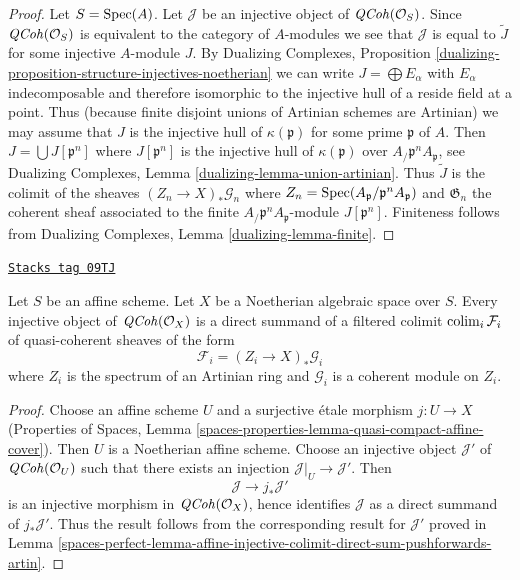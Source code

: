 \begin{proof}
Let $S = \operatorname{Spec}(A)$. Let $\mathcal{J}$ be an injective object of
$\mathit{QCoh}(\mathcal{O}_S)$. Since $\mathit{QCoh}(\mathcal{O}_S)$ is
equivalent to the category of $A$-modules we see that $\mathcal{J}$
is equal to $\widetilde{J}$ for some injective $A$-module $J$.
By Dualizing Complexes, Proposition
\ref{dualizing-proposition-structure-injectives-noetherian}
we can write $J = \bigoplus E_\alpha$ with $E_\alpha$ indecomposable
and therefore isomorphic to the injective hull of a reside field
at a point. Thus (because finite disjoint unions of Artinian schemes
are Artinian) we may assume that $J$ is the injective hull
of $\kappa(\mathfrak p)$ for some prime $\mathfrak p$ of $A$.
Then $J = \bigcup J[\mathfrak p^n]$ where $J[\mathfrak p^n]$ is
the injective hull of $\kappa(\mathfrak p)$ over
$A_\mathfrak/\mathfrak p^nA_\mathfrak p$, see
Dualizing Complexes, Lemma \ref{dualizing-lemma-union-artinian}.
Thus $\widetilde{J}$ is the colimit of the sheaves
$(Z_n \to X)_*\mathcal{G}_n$ where
$Z_n = \operatorname{Spec}(A_\mathfrak p/\mathfrak p^nA_\mathfrak p)$ and
$\mathfrak G_n$ the coherent sheaf associated to the
finite $A_\mathfrak/\mathfrak p^nA_\mathfrak p$-module $J[\mathfrak p^n]$.
Finiteness follows from
Dualizing Complexes, Lemma \ref{dualizing-lemma-finite}.
\end{proof}

\begin{lemma}
\label{spaces-perfect-lemma-injective-colimit-direct-sum-pushforwards-artin}
\href{https://stacks.math.columbia.edu/tag/09TJ}{\texttt{Stacks tag 09TJ}}

Let $S$ be an affine scheme. Let $X$ be a Noetherian algebraic space
over $S$. Every injective object of $\mathit{QCoh}(\mathcal{O}_X)$ is
a direct summand of a filtered colimit $\operatorname{colim}_i \mathcal{F}_i$
of quasi-coherent sheaves of the form
$$
\mathcal{F}_i = (Z_i \to X)_*\mathcal{G}_i
$$
where $Z_i$ is the spectrum of an Artinian ring and $\mathcal{G}_i$
is a coherent module on $Z_i$.
\end{lemma}

\begin{proof}
Choose an affine scheme $U$ and a surjective \'etale morphism
$j : U \to X$ (Properties of Spaces, Lemma
\ref{spaces-properties-lemma-quasi-compact-affine-cover}).
Then $U$ is a Noetherian affine scheme. Choose an injective object
$\mathcal{J}'$ of $\mathit{QCoh}(\mathcal{O}_U)$ such that there
exists an injection $\mathcal{J}|_U \to \mathcal{J}'$. Then
$$
\mathcal{J} \to j_*\mathcal{J}'
$$
is an injective morphism in $\mathit{QCoh}(\mathcal{O}_X)$,
hence identifies $\mathcal{J}$ as a direct summand of $j_*\mathcal{J}'$.
Thus the result follows from the corresponding result for
$\mathcal{J}'$ proved in
Lemma \ref{spaces-perfect-lemma-affine-injective-colimit-direct-sum-pushforwards-artin}.
\end{proof}

